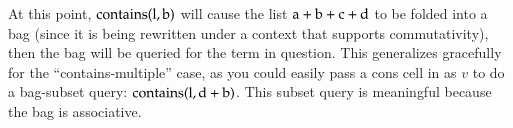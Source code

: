 \documentclass{report}
\begin{document}
    At this point, $\textrm{contains}(\textrm l, \textrm b)$ will cause the list $\textrm a + \textrm b + \textrm c + \textrm d$ to be folded into a bag (since it is being rewritten under a
    context that supports commutativity), then the bag will be queried for the term in question. This generalizes gracefully for the ``contains-multiple'' case, as you could easily pass a cons
    cell in as $v$ to do a bag-subset query: $\textrm{contains}(\textrm l, \textrm d + \textrm b)$. This subset query is meaningful because the bag is associative.
\end{document}

